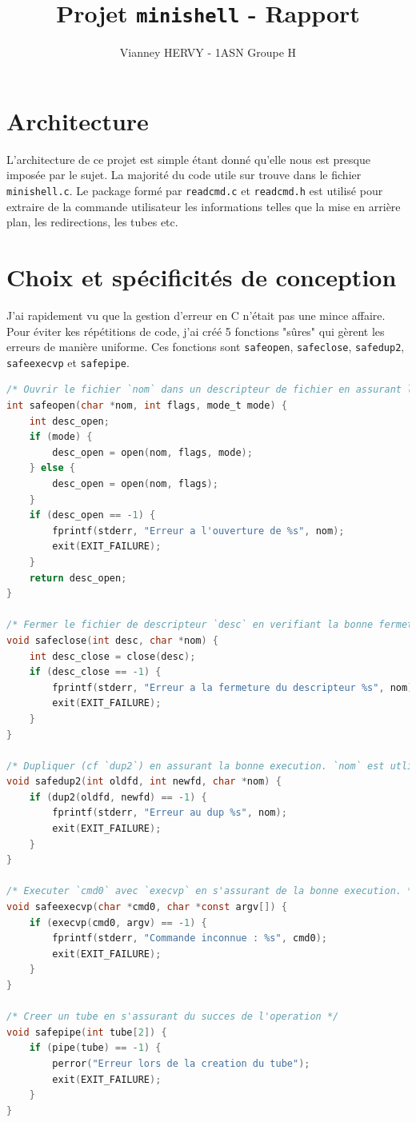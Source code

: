 \documentclass{article}
\title{Projet \texttt{minishell} - Rapport}
\author{Vianney HERVY - 1ASN Groupe H}
\begin{document}
\maketitle
\tableofcontents
\newpage

\section{Architecture}

L'architecture de ce projet est simple étant donné qu'elle nous est presque imposée par le sujet. La majorité du code utile sur trouve dans le fichier \texttt{minishell.c}. Le package formé par \texttt{readcmd.c} et \texttt{readcmd.h} est utilisé pour extraire de la commande utilisateur les informations telles que la mise en arrière plan, les redirections, les tubes etc.

\section{Choix et spécificités de conception}

J'ai rapidement vu que la gestion d'erreur en C n'était pas une mince affaire. Pour éviter kes répétitions de code, j'ai créé 5 fonctions "sûres" qui gèrent les erreurs de manière uniforme. Ces fonctions sont \texttt{safeopen}, \texttt{safeclose}, \texttt{safedup2}, \texttt{safeexecvp} et \texttt{safepipe}.

\begin{lstlisting}[language=C, caption=Code des fonctions "sûres"]
/* Ouvrir le fichier `nom` dans un descripteur de fichier en assurant la bonne execution. Retourne le descripteur de fichier associe. */
int safeopen(char *nom, int flags, mode_t mode) {
    int desc_open;
    if (mode) {
        desc_open = open(nom, flags, mode);
    } else {
        desc_open = open(nom, flags);
    }
    if (desc_open == -1) {
        fprintf(stderr, "Erreur a l'ouverture de %s", nom);
        exit(EXIT_FAILURE);
    }
    return desc_open;
}

/* Fermer le fichier de descripteur `desc` en verifiant la bonne fermeture. `nom` est utilise en cas d'erreur. */
void safeclose(int desc, char *nom) {
    int desc_close = close(desc);
    if (desc_close == -1) {
        fprintf(stderr, "Erreur a la fermeture du descripteur %s", nom);
        exit(EXIT_FAILURE);
    }
}

/* Dupliquer (cf `dup2`) en assurant la bonne execution. `nom` est utlise en cas d'erreur. */
void safedup2(int oldfd, int newfd, char *nom) {
    if (dup2(oldfd, newfd) == -1) {
        fprintf(stderr, "Erreur au dup %s", nom);
        exit(EXIT_FAILURE);
    }
}

/* Executer `cmd0` avec `execvp` en s'assurant de la bonne execution. */
void safeexecvp(char *cmd0, char *const argv[]) {
    if (execvp(cmd0, argv) == -1) {
        fprintf(stderr, "Commande inconnue : %s", cmd0);
        exit(EXIT_FAILURE);
    }
}

/* Creer un tube en s'assurant du succes de l'operation */
void safepipe(int tube[2]) {
    if (pipe(tube) == -1) {
        perror("Erreur lors de la creation du tube");
        exit(EXIT_FAILURE);
    }
}
\end{lstlisting}
\end{document}
